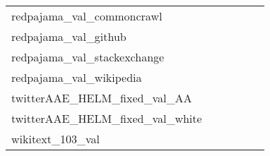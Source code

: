 {\begin{longtable}{m{6cm}m{1.7cm}m{1.7cm}m{1.7cm}m{1.7cm}m{1.7cm}}
	redpajama\_val\_commoncrawl  & \colorbox[HTML]{fcfed8}{\makebox[\mywidth][c]{10.90}} & \colorbox[HTML]{e2f3a9}{\makebox[\mywidth][c]{10.56}} & \colorbox[HTML]{ffffe5}{\makebox[\mywidth][c]{11.70}} & \colorbox[HTML]{d8efa2}{\makebox[\mywidth][c]{10.52}} & \colorbox[HTML]{77c578}{\makebox[\mywidth][c]{10.35}}\\
	redpajama\_val\_github  & \colorbox[HTML]{e5f4ab}{\makebox[\mywidth][c]{1.66}} & \colorbox[HTML]{eff8b3}{\makebox[\mywidth][c]{1.66}} & \colorbox[HTML]{ffffe5}{\makebox[\mywidth][c]{1.75}} & \colorbox[HTML]{d3eda0}{\makebox[\mywidth][c]{1.65}} & \colorbox[HTML]{77c578}{\makebox[\mywidth][c]{1.64}}\\
	redpajama\_val\_stackexchange  & \colorbox[HTML]{f6fbb8}{\makebox[\mywidth][c]{3.73}} & \colorbox[HTML]{eff8b3}{\makebox[\mywidth][c]{3.72}} & \colorbox[HTML]{ffffe5}{\makebox[\mywidth][c]{4.03}} & \colorbox[HTML]{d1ec9f}{\makebox[\mywidth][c]{3.68}} & \colorbox[HTML]{77c578}{\makebox[\mywidth][c]{3.63}}\\
	redpajama\_val\_wikipedia  & \colorbox[HTML]{ffffe5}{\makebox[\mywidth][c]{4.64}} & \colorbox[HTML]{f5fbb7}{\makebox[\mywidth][c]{4.38}} & \colorbox[HTML]{ffffe5}{\makebox[\mywidth][c]{4.68}} & \colorbox[HTML]{e2f3a9}{\makebox[\mywidth][c]{4.35}} & \colorbox[HTML]{77c578}{\makebox[\mywidth][c]{4.29}}\\
	twitterAAE\_HELM\_fixed\_val\_AA  & \colorbox[HTML]{ffffe5}{\makebox[\mywidth][c]{346.98}} & \colorbox[HTML]{f4fab6}{\makebox[\mywidth][c]{302.79}} & \colorbox[HTML]{fbfdd1}{\makebox[\mywidth][c]{310.30}} & \colorbox[HTML]{eff8b3}{\makebox[\mywidth][c]{301.65}} & \colorbox[HTML]{77c578}{\makebox[\mywidth][c]{289.97}}\\
	twitterAAE\_HELM\_fixed\_val\_white  & \colorbox[HTML]{ffffe5}{\makebox[\mywidth][c]{118.62}} & \colorbox[HTML]{e4f4ab}{\makebox[\mywidth][c]{107.34}} & \colorbox[HTML]{f9fcc6}{\makebox[\mywidth][c]{109.13}} & \colorbox[HTML]{eaf7af}{\makebox[\mywidth][c]{107.65}} & \colorbox[HTML]{77c578}{\makebox[\mywidth][c]{105.13}}\\
	wikitext\_103\_val  & \colorbox[HTML]{e7f5ad}{\makebox[\mywidth][c]{11.74}} & \colorbox[HTML]{eaf7af}{\makebox[\mywidth][c]{11.76}} & \colorbox[HTML]{ffffe5}{\makebox[\mywidth][c]{13.73}} & \colorbox[HTML]{77c578}{\makebox[\mywidth][c]{11.32}} & \colorbox[HTML]{9dd687}{\makebox[\mywidth][c]{11.41}}\\
\end{longtable}
}